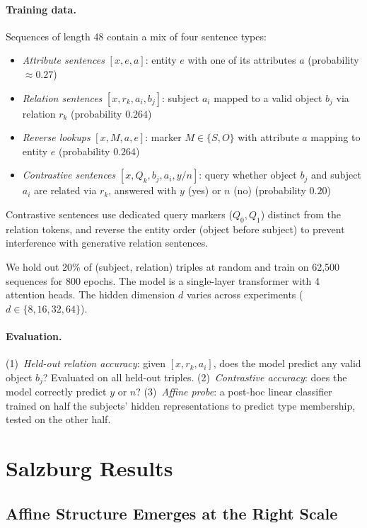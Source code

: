 \documentclass[11pt]{article}
\begin{document}
\paragraph{Training data.}
Sequences of length 48 contain a mix of four sentence types:
\begin{itemize}
\item \emph{Attribute sentences} $[x, e, a]$: entity $e$ with one of its attributes $a$
  (probability ${\approx}0.27$)
\item \emph{Relation sentences} $[x, r_k, a_i, b_j]$: subject $a_i$ mapped to a valid
  object $b_j$ via relation $r_k$ (probability $0.264$)
\item \emph{Reverse lookups} $[x, M, a, e]$: marker $M \in \{S, O\}$ with attribute $a$
  mapping to entity $e$ (probability $0.264$)
\item \emph{Contrastive sentences} $[x, Q_k, b_j, a_i, y/n]$: query whether object $b_j$
  and subject $a_i$ are related via $r_k$, answered with $y$ (yes) or $n$ (no)
  (probability $0.20$)
\end{itemize}
Contrastive sentences use dedicated query markers ($Q_0, Q_1$) distinct from the
relation tokens, and reverse the entity order (object before subject) to prevent
interference with generative relation sentences.

We hold out 20\% of (subject, relation) triples at random and train on 62{,}500
sequences for 800 epochs. The model is a single-layer transformer with 4 attention heads.
The hidden dimension $d$ varies across experiments ($d \in \{8, 16, 32, 64\}$).

\paragraph{Evaluation.}
(1)~\emph{Held-out relation accuracy}: given $[x, r_k, a_i]$, does the model predict
any valid object $b_j$? Evaluated on all held-out triples. (2)~\emph{Contrastive
accuracy}: does the model correctly predict $y$ or $n$? (3)~\emph{Affine probe}: a
post-hoc linear classifier trained on half the subjects' hidden representations to
predict type membership, tested on the other half.

\section{Salzburg Results}

\subsection{Affine Structure Emerges at the Right Scale}
\end{document}
